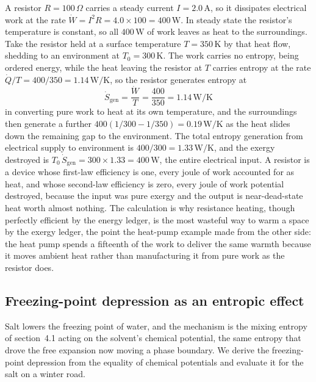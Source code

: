 A resistor $R = 100\,\Omega$ carries a steady current $I = 2.0\,\text{A}$, so it
dissipates electrical work at the rate $\dot W = I^2 R = 4.0 \times 100 =
400\,\text{W}$. In steady state the resistor's temperature is constant, so all
$400\,\text{W}$ of work leaves as heat to the surroundings. Take the resistor held
at a surface temperature $T = 350\,\si{\kelvin}$ by that heat flow, shedding to an
environment at $T_0 = 300\,\si{\kelvin}$. The work carries no entropy, being ordered
energy, while the heat leaving the resistor at $T$ carries entropy at the rate
$\dot Q/T = 400/350 = 1.14\,\si{\watt\per\kelvin}$, so the resistor generates
entropy at
\[
\dot S_{\text{gen}} = \frac{\dot W}{T} = \frac{400}{350}
= 1.14\,\si{\watt\per\kelvin}
\]
in converting pure work to heat at its own temperature, and the surroundings then
generate a further $400(1/300 - 1/350) = 0.19\,\si{\watt\per\kelvin}$ as the heat
slides down the remaining gap to the environment. The total entropy generation from
electrical supply to environment is $400/300 = 1.33\,\si{\watt\per\kelvin}$, and the
exergy destroyed is $T_0\,\dot S_{\text{gen}} = 300 \times 1.33 = 400\,\text{W}$,
the entire electrical input. A resistor is a device whose first-law efficiency is
one, every joule of work accounted for as heat, and whose second-law efficiency is
zero, every joule of work potential destroyed, because the input was pure exergy and
the output is near-dead-state heat worth almost nothing. The calculation is why
resistance heating, though perfectly efficient by the energy ledger, is the most
wasteful way to warm a space by the exergy ledger, the point the heat-pump example
made from the other side: the heat pump spends a fifteenth of the work to deliver
the same warmth because it moves ambient heat rather than manufacturing it from pure
work as the resistor does.

\subsection{Freezing-point depression as an entropic effect}

Salt lowers the freezing point of water, and the mechanism is the mixing entropy of
section~4.1 acting on the solvent's chemical potential, the same entropy that drove
the free expansion now moving a phase boundary. We derive the freezing-point
depression from the equality of chemical potentials and evaluate it for the salt on
a winter road.

